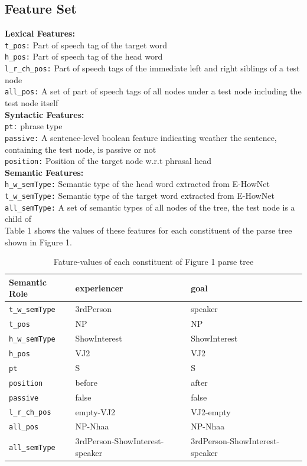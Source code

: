 \documentclass[11pt]{article}
\begin{document}
\subsection{Feature Set}
\textbf{Lexical Features:} \\ 
\verb+t_pos:+ Part of speech tag of the target word\\
\verb+h_pos:+ Part of speech tag of the head word\\ 
\verb+l_r_ch_pos:+ Part of speech tags of the immediate left and right siblings of a test node\\
\verb+all_pos:+ A set of part of speech tags of all nodes under a test node including the test node itself\\[0.2cm]
\textbf{Syntactic Features:} \\ 
\verb+pt:+ phrase type\\
\verb+passive:+ A sentence-level boolean feature indicating weather the sentence, containing the test node, is passive or not\\
\verb+position:+ Position of the target node w.r.t phrasal head\\[0.2cm]
\textbf{Semantic Features:}\\
\verb+h_w_semType:+ Semantic type of the head word extracted from E-HowNet \\ 
\verb+t_w_semType:+ Semantic type of the target word extracted from E-HowNet\\ 
\verb+all_semType:+ A set of semantic types of all nodes of the tree, the test node is a child of\\[0.2cm]
Table 1 shows the values of these features for each constituent of the parse tree shown in Figure 1.
\begin{table}[!h]
\small
\begin{tabular}{|p{2cm}|p{2cm}|p{2cm}|}
\hline \textbf{Semantic Role} & experiencer & goal \\
\hline \verb+t_w_semType+ & 3rdPerson  & speaker \\
\hline \verb+t_pos+ & NP &  NP \\ 
\hline \verb+h_w_semType+ &  ShowInterest & ShowInterest \\ 
\hline \verb+h_pos+ & VJ2 & VJ2 \\ 
\hline \verb+pt+ & S & S \\ 
\hline \verb+position+ & before & after \\ 
\hline \verb+passive+ & false & false \\ 
\hline \verb+l_r_ch_pos+ & empty-VJ2 & VJ2-empty\\ 
\hline \verb+all_pos+ & NP-Nhaa  & NP-Nhaa\\ 
\hline \verb+all_semType+ & 3rdPerson-ShowInterest-speaker  &  3rdPerson-ShowInterest-speaker\\ 
\hline 
\end{tabular}
\caption{Fature-values of each constituent of Figure 1 parse tree}
\normalsize 
\end{table}
\end{document}
